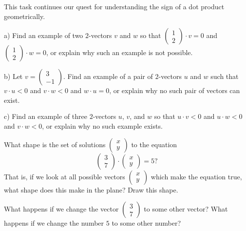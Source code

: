 \documentclass[cahier-main.tex]{subfiles}
\begin{document}
\begin{task} This task continues our quest for understanding the sign of a dot product geometrically.
\begin{compactitem}
\item[a)] Find an example of two $2$-vectors $v$ and $w$ so that $\left(\begin{smallmatrix}1 \\ 2 \end{smallmatrix}\right)\cdot v =0$ and $\left(\begin{smallmatrix}1 \\ 2 \end{smallmatrix}\right)\cdot w = 0$, or explain why such an example is not possible.

\item[b)] Let $v = \left(\begin{smallmatrix}3\\-1 \end{smallmatrix}\right)$. Find an example of a pair of $2$-vectors $u$ and $w$ such that $v \cdot u < 0$ and $v \cdot w < 0$ and $w \cdot u = 0$, or explain why no such pair of vectors can exist.

\item[c)] Find an example of three $2$-vectors $u$, $v$, and $w$ so that $u \cdot v < 0$ and $u\cdot w < 0$ and $v \cdot w < 0$, or explain why no such example exists.
\end{compactitem}
\end{task}

\begin{task}
What shape is the set of solutions $\left(\begin{smallmatrix} x \\ y \end{smallmatrix}\right)$ to the equation
\[
\begin{pmatrix} 3 \\ 7\end{pmatrix} \cdot \begin{pmatrix} x \\ y \end{pmatrix} = 5?
\] 
That is, if we look at all possible vectors $\left(\begin{smallmatrix} x \\ y \end{smallmatrix}\right)$
which make the equation true, what shape does this make in the plane? Draw this shape.

What happens if we change the vector $\left(\begin{smallmatrix} 3 \\ 7 \end{smallmatrix}\right)$ to some other vector? What happens if we change the number $5$ to some other number?
\end{task}
\end{document}
